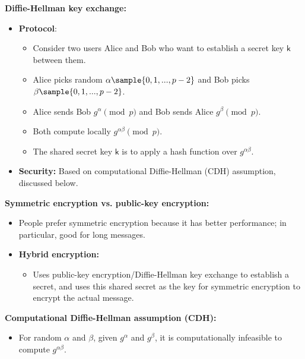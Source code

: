 \documentclass{article}
\newcommand{\msf}[1]{\mathsf{#1}}
\newcommand{\parhead}[1]{\noindent \textbf{#1}}
\begin{document}
\parhead{Diffie-Hellman key exchange:}
\begin{itemize}
    \item {\bf Protocol}: 
    \begin{itemize}
    \item Consider two users Alice and Bob who want to establish a secret key $\msf{k}$ between them.
    
    \item Alice picks random $\alpha\sample\{0,1,...,p-2\}$ and Bob picks $\beta\sample\{0,1,...,p-2\}$.
    
    \item Alice sends Bob $g^\alpha \pmod{p}$ and Bob sends Alice $g^\beta \pmod{p}$.
    
    \item Both compute locally $g^{\alpha\beta}\pmod{p}$.
    
    \item The shared secret key $\msf{k}$ is to apply a hash function over $g^{\alpha\beta}$.
    \end{itemize}
    
    \item {\bf Security:} Based on computational Diffie-Hellman (CDH) assumption, discussed below.

\end{itemize}

\parhead{Symmetric encryption vs. public-key encryption:}
\begin{itemize}
    \item People prefer symmetric encryption because it has better performance; in particular, good for long messages.
    
    \item {\bf Hybrid encryption:}
    \begin{itemize}
        \item Uses public-key encryption/Diffie-Hellman key exchange to establish a secret, and uses this shared secret as the key for symmetric encryption to encrypt the actual message.
    \end{itemize}
\end{itemize}

\parhead{Computational Diffie-Hellman assumption (CDH):}
\begin{itemize}
    \item For random $\alpha$ and $\beta$, given $g^{\alpha}$ and $g^{\beta}$, it is computationally infeasible to compute $g^{\alpha\beta}$.
\end{itemize}
\end{document}
